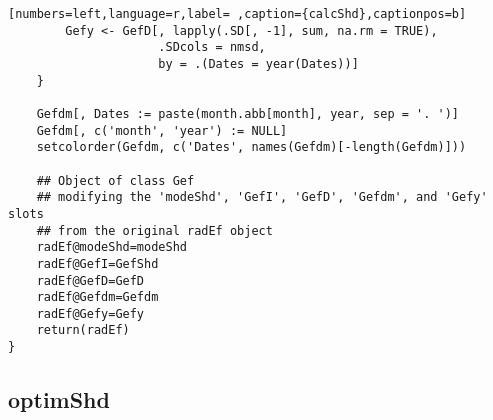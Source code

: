 \begin{lstlisting}[numbers=left,language=r,label= ,caption={calcShd},captionpos=b]
        Gefy <- GefD[, lapply(.SD[, -1], sum, na.rm = TRUE),
                     .SDcols = nmsd,
                     by = .(Dates = year(Dates))]
    }

    Gefdm[, Dates := paste(month.abb[month], year, sep = '. ')]
    Gefdm[, c('month', 'year') := NULL]
    setcolorder(Gefdm, c('Dates', names(Gefdm)[-length(Gefdm)]))

    ## Object of class Gef
    ## modifying the 'modeShd', 'GefI', 'GefD', 'Gefdm', and 'Gefy' slots
    ## from the original radEf object
    radEf@modeShd=modeShd
    radEf@GefI=GefShd
    radEf@GefD=GefD
    radEf@Gefdm=Gefdm
    radEf@Gefy=Gefy
    return(radEf)
}
\end{lstlisting}
\subsection{optimShd}
\label{sec:org9f14641}
